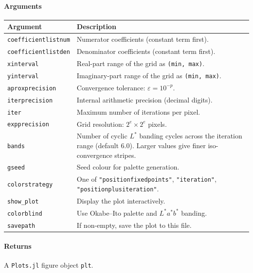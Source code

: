 \documentclass[11pt,a4paper]{article}
\theoremstyle{definition}
\newcommand{\pkg}[1]{\texttt{#1}}
\begin{document}
\paragraph{Arguments}

\begin{center}
\renewcommand{\arraystretch}{1.25}
\begin{tabular}{lp{9cm}}
\toprule
Argument & Description \\
\midrule
\texttt{coefficientlistnum} & Numerator coefficients (constant term first).\\
\texttt{coefficientlistden} & Denominator coefficients (constant term first).\\
\texttt{xinterval} & Real-part range of the grid as \texttt{(min, max)}.\\
\texttt{yinterval} & Imaginary-part range of the grid as \texttt{(min, max)}.\\
\texttt{aproxprecision} & Convergence tolerance: $\varepsilon=10^{-p}$.\\
\texttt{iterprecision} & Internal arithmetic precision (decimal digits).\\
\texttt{iter} & Maximum number of iterations per pixel.\\
\texttt{expprecision} & Grid resolution: $2^e \times 2^e$ pixels.\\
\texttt{bands} & Number of cyclic $L^*$ banding cycles across the iteration
  range (default $6.0$). Larger values give finer iso-convergence stripes.\\
\texttt{gseed} & Seed colour for palette generation.\\
\texttt{colorstrategy} & One of \texttt{"positionfixedpoints"},
                         \texttt{"iteration"},
                         \texttt{"positionplusiteration"}.\\
\texttt{show\_plot} & Display the plot interactively.\\
\texttt{colorblind} & Use Okabe--Ito palette and $L^*a^*b^*$ banding.\\
\texttt{savepath} & If non-empty, save the plot to this file.\\
\bottomrule
\end{tabular}
\end{center}

\paragraph{Returns}
A \pkg{Plots.jl} figure object \texttt{plt}.
\end{document}
